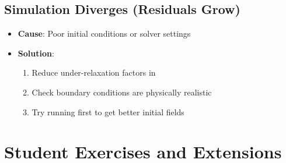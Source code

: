 \documentclass[
    parskip=half,      %
    DIV=12,            %
    headings=normal,   %
    fontsize=11pt,     %
    english            %
]{scrartcl}
\begin{document}
\subsection{Simulation Diverges (Residuals Grow)}
\begin{itemize}
\item \textbf{Cause}: Poor initial conditions or solver settings
\item \textbf{Solution}:
\begin{enumerate}
\item Reduce under-relaxation factors in 
\item Check boundary conditions are physically realistic
\item Try running  first to get better initial fields
\end{enumerate}
\end{itemize}


\section{Student Exercises and Extensions}
\end{document}
